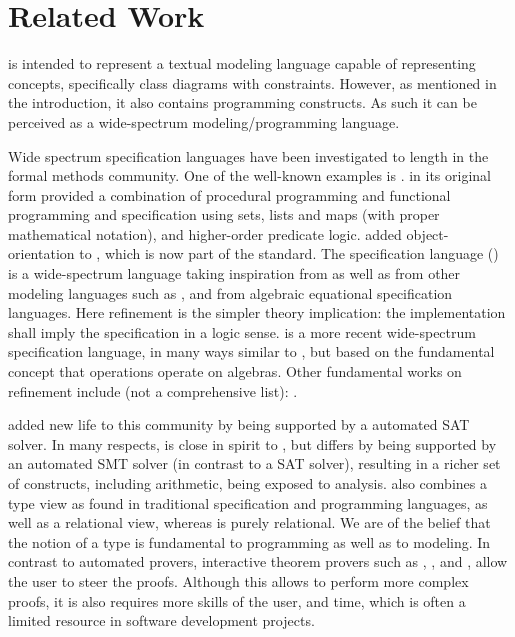
\section{Related Work}
\label{sec:related-work}

\Klang{} is intended to represent a textual modeling language capable
of representing \sysml{} concepts, specifically class diagrams with
constraints.  However, as mentioned in the introduction, it also
contains programming constructs.  As such it can be perceived as a
wide-spectrum modeling/programming language.

Wide spectrum specification languages have been investigated to length
in the formal methods community. One of the well-known examples
is \vdm{} \cite{vdm78,bjoerner-jones-82,jones90,jones-shaw-90}. \vdm{}
in its original form \cite{vdm78} provided a combination of procedural
programming and functional programming and specification using sets,
lists and maps (with proper mathematical notation), and higher-order
predicate logic. \vdmpp{} \cite{vdmplusplus05} added
object-orientation to \vdm{}, which is now part of the \vdm{}
standard. The \raiselang{} specification language (\rsl{})
\cite{raise92} is a wide-spectrum language taking inspiration from
\vdm{} as well as from other modeling languages such as \zlang{}
\cite{spivey-Z-1988}, and from algebraic equational specification
languages. Here refinement is the simpler theory implication: the implementation
shall imply the specification in a logic sense. \asml{} \cite{asml05} is a 
more recent wide-spectrum specification language, in many ways similar to \vdm{}, 
but based on the fundamental concept that operations operate on algebras. 
Other fundamental works on refinement include (not a comprehensive list): \cite{wirth-refinement-71,hoare-sanders-refinement-86,morgan-refinement-94,woodcock-sanders-z-96,back-wright-refinement-98,abrial-eventb-10}.

\alloy{} \cite{jackson-alloy-12} added new life to this community by being 
supported by a automated SAT solver. In many respects, \Klang{} is close in spirit 
to \alloy{}, but differs by being supported by an automated SMT solver 
(in contrast to a SAT solver), resulting in a richer set of constructs, including arithmetic, being exposed to analysis. \Klang{} also combines a type view as found in traditional specification and programming languages, as well as a relational 
view, whereas \alloy{} is purely relational. We are of the belief that the notion
of a type is fundamental to programming as well as to modeling. In contrast
to automated provers, interactive theorem provers such as
\pvs{} \cite{cade92-pvs,pvs-website}, \coq \cite{coq-website}, and 
\isabelle \cite{isabelle-website}, allow the user to steer the proofs. 
Although this allows to perform more complex proofs, it is also requires more
skills of the user, and time, which is often a limited resource in software development projects.

